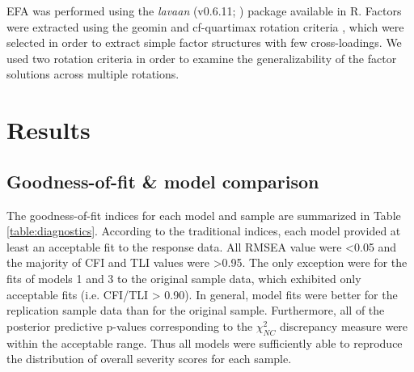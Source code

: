 \documentclass[letterpaper,man,natbib,floatsintext,longtable]{apa6}
\begin{document}
EFA was performed using the \textit{lavaan} (v0.6.11; \citealt{lavaan}) package available in R. Factors were extracted using the geomin \citep{yates1987multivariate} and cf-quartimax rotation criteria \citep{crawford1970general}, which were selected in order to extract simple factor structures with few cross-loadings. We used two rotation criteria in order to examine the generalizability of the factor solutions across multiple rotations. 

\section{Results}

\subsection{Goodness-of-fit \& model comparison}

The goodness-of-fit indices for each model and sample are summarized in Table \ref{table:diagnostics}. According to the traditional indices, each model provided at least an acceptable fit to the response data. All RMSEA value were <0.05 and the majority of CFI and TLI values were >0.95. The only exception were for the fits of models 1 and 3 to the original sample data, which exhibited only acceptable fits (i.e. CFI/TLI > 0.90). In general, model fits were better for the replication sample data than for the original sample. Furthermore, all of the posterior predictive p-values corresponding to the $\chi^2_{NC}$ discrepancy measure were within the acceptable range. Thus all models were sufficiently able to reproduce the distribution of overall severity scores for each sample.
\end{document}
